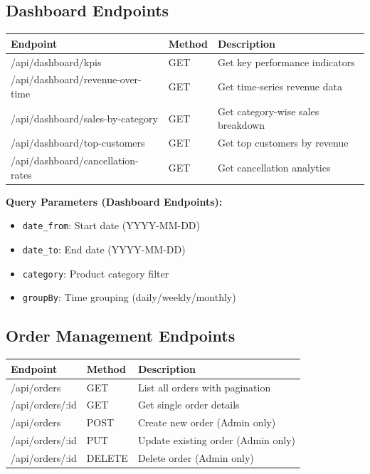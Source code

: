\documentclass[12pt,a4paper]{article}
\begin{document}
\subsection{Dashboard Endpoints}

\begin{longtable}{|p{4.5cm}|p{1.5cm}|p{7cm}|}
\hline
\textbf{Endpoint} & \textbf{Method} & \textbf{Description} \\
\hline
/api/dashboard/kpis & GET & Get key performance indicators \\
\hline
/api/dashboard/revenue-over-time & GET & Get time-series revenue data \\
\hline
/api/dashboard/sales-by-category & GET & Get category-wise sales breakdown \\
\hline
/api/dashboard/top-customers & GET & Get top customers by revenue \\
\hline
/api/dashboard/cancellation-rates & GET & Get cancellation analytics \\
\hline
\end{longtable}

\textbf{Query Parameters (Dashboard Endpoints):}
\begin{itemize}[leftmargin=*]
    \item \texttt{date\_from}: Start date (YYYY-MM-DD)
    \item \texttt{date\_to}: End date (YYYY-MM-DD)
    \item \texttt{category}: Product category filter
    \item \texttt{groupBy}: Time grouping (daily/weekly/monthly)
\end{itemize}

\subsection{Order Management Endpoints}

\begin{longtable}{|p{3.5cm}|p{1.5cm}|p{8cm}|}
\hline
\textbf{Endpoint} & \textbf{Method} & \textbf{Description} \\
\hline
/api/orders & GET & List all orders with pagination \\
\hline
/api/orders/:id & GET & Get single order details \\
\hline
/api/orders & POST & Create new order (Admin only) \\
\hline
/api/orders/:id & PUT & Update existing order (Admin only) \\
\hline
/api/orders/:id & DELETE & Delete order (Admin only) \\
\hline
\end{longtable}
\end{document}
